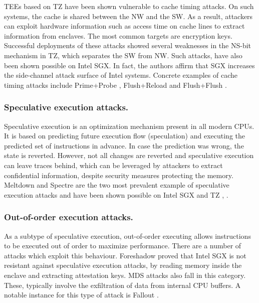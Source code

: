 \documentclass[runningheads,a4paper]{uwsese}
\begin{document}
\glspl{TEE} based on \gls{TZ} have been shown vulnerable to cache timing
attacks. On such systems, the cache is shared between the \gls{NW} and the
\gls{SW}. As a result, attackers can exploit hardware information such as
access time on cache lines to extract information from enclaves. The most
common targets are encryption keys. Successful deployments of these attacks
showed several weaknesses in the NS-bit mechanism in \gls{TZ}, which separates
the \gls{SW} from \gls{NW}. Such attacks, have also been shown possible on
Intel SGX. In fact, the authors affirm that SGX increases the side-channel
attack surface \cite{cache_sgx} of Intel systems. Concrete examples of cache
timing attacks include Prime+Probe \cite{prime_probe}, Flush+Reload
\cite{flush_reload} and Flush+Flush \cite{flush_flush}.

\subsubsection{Speculative execution attacks.}

Speculative execution is an optimization mechanism present in all modern
\glspl{CPU}. It is based on predicting future execution flow (speculation) and
executing the predicted set of instructions in advance. In case the prediction
was wrong, the state is reverted. However, not all changes are reverted and
speculative execution can leave traces behind, which can be leveraged by
attackers to extract confidential information, despite security measures
protecting the memory. Meltdown and Spectre are the two most prevalent example
of speculative execution attacks and have been shown possible on Intel SGX and
\gls{TZ} \cite{brasser}, \cite{sgxpectre}.

\subsubsection{Out-of-order execution attacks.}

As a subtype of speculative execution, out-of-order executing allows
instructions to be executed out of order to maximize performance. There are a
number of attacks which exploit this behaviour. Foreshadow \cite{foreshadow}
proved that Intel SGX is not resistant against speculative execution attacks,
by reading memory inside the enclave and extracting attestation keys. \gls{MDS}
attacks also fall in this category. These, typically involve the exfiltration
of data from internal \gls{CPU} buffers. A notable instance for this type of
attack is Fallout \cite{fallout}.
\end{document}
